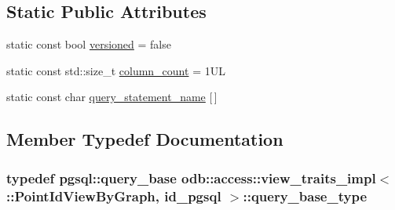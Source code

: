 \subsection*{Static Public Attributes}
\begin{DoxyCompactItemize}
\item 
static const bool \hyperlink{classodb_1_1access_1_1view__traits__impl_3_01_1_1_point_id_view_by_graph_00_01id__pgsql_01_4_ac17ca3cb8a238e5b22e407829593ddd0}{versioned} = false
\item 
static const std\+::size\+\_\+t \hyperlink{classodb_1_1access_1_1view__traits__impl_3_01_1_1_point_id_view_by_graph_00_01id__pgsql_01_4_a19357acd84391058f5f58024a5828012}{column\+\_\+count} = 1\+U\+L
\item 
static const char \hyperlink{classodb_1_1access_1_1view__traits__impl_3_01_1_1_point_id_view_by_graph_00_01id__pgsql_01_4_aa27069d412a34e213b15033893d16684}{query\+\_\+statement\+\_\+name} \mbox{[}$\,$\mbox{]}
\end{DoxyCompactItemize}


\subsection{Member Typedef Documentation}
\hypertarget{classodb_1_1access_1_1view__traits__impl_3_01_1_1_point_id_view_by_graph_00_01id__pgsql_01_4_ab4e7cb641cd3d4b4a38077b108884feb}{}
\subsubsection[{query\+\_\+base\+\_\+type}]{\setlength{\rightskip}{0pt plus 5cm}typedef pgsql\+::query\+\_\+base odb\+::access\+::view\+\_\+traits\+\_\+impl$<$ \+::{\bf Point\+Id\+View\+By\+Graph}, id\+\_\+pgsql $>$\+::{\bf query\+\_\+base\+\_\+type}}\label{classodb_1_1access_1_1view__traits__impl_3_01_1_1_point_id_view_by_graph_00_01id__pgsql_01_4_ab4e7cb641cd3d4b4a38077b108884feb}
\hypertarget{classodb_1_1access_1_1view__traits__impl_3_01_1_1_point_id_view_by_graph_00_01id__pgsql_01_4_a2301c838c78fe5f575b2751dda7de447}{}
